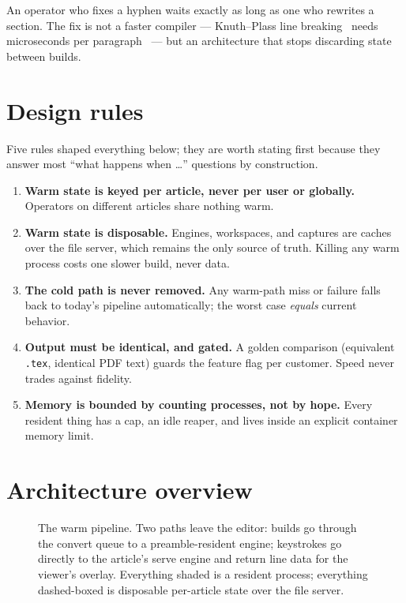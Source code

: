 \documentclass{ltugboat}
\begin{document}
An operator who fixes a hyphen waits exactly as long as one who
rewrites a section. The fix is not a faster compiler --- Knuth--Plass line
breaking~\cite{knuth:linebreak} needs microseconds per
paragraph~\cite{lode:realtime} --- but an architecture that stops
discarding state between builds.

\section{Design rules}

Five rules shaped everything below; they are worth stating first
because they answer most ``what happens when \ldots'' questions by
construction.

\begin{enumerate}
\item \textbf{Warm state is keyed per article, never per user or
  globally.} Operators on different articles share nothing warm.
\item \textbf{Warm state is disposable.} Engines, workspaces, and
  captures are caches over the file server, which remains the only
  source of truth. Killing any warm process costs one slower build,
  never data.
\item \textbf{The cold path is never removed.} Any warm-path miss or
  failure falls back to today's pipeline automatically; the worst case
  \emph{equals} current behavior.
\item \textbf{Output must be identical, and gated.} A golden
  comparison (equivalent \texttt{.tex}, identical PDF text) guards the
  feature flag per customer. Speed never trades against fidelity.
\item \textbf{Memory is bounded by counting processes, not by hope.}
  Every resident thing has a cap, an idle reaper, and lives inside an
  explicit container memory limit.
\end{enumerate}

\section{Architecture overview}

\begin{figure}[tb]
\centering
\resizebox{\textwidth}{!}{}
\caption{The warm pipeline. Two paths leave the editor: builds go
through the convert queue to a preamble-resident engine; keystrokes go
directly to the article's serve engine and return line data for the
viewer's overlay. Everything shaded is a resident process; everything
dashed-boxed is disposable per-article state over the file server.}
\label{fig:arch}
\end{figure}
\end{document}
